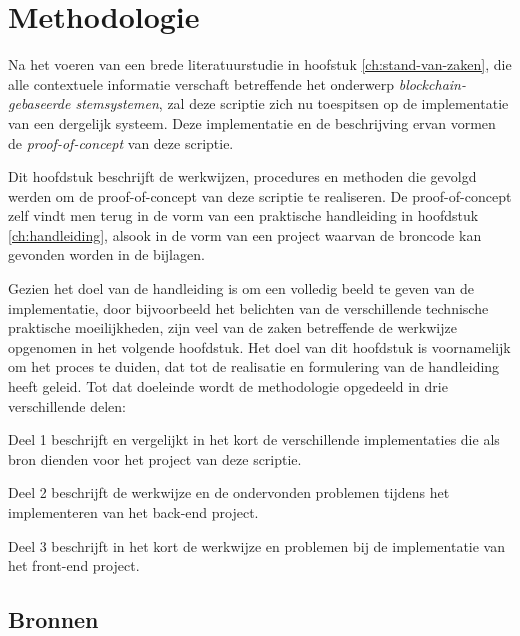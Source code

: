 
\chapter{Methodologie}
\label{ch:methodologie}

Na het voeren van een brede literatuurstudie in hoofstuk \ref{ch:stand-van-zaken}, die  alle contextuele informatie verschaft betreffende het onderwerp \textit{blockchain-gebaseerde stemsystemen}, zal deze scriptie zich nu toespitsen op de implementatie van een dergelijk systeem. Deze implementatie en de beschrijving ervan vormen de  \textit{proof-of-concept} van deze scriptie.

 Dit hoofdstuk beschrijft de werkwijzen, procedures en methoden die gevolgd werden om de  proof-of-concept van deze scriptie te realiseren. De proof-of-concept zelf vindt men terug in de vorm van een praktische handleiding in hoofdstuk \ref{ch:handleiding}, alsook in de vorm van een project waarvan de broncode kan gevonden worden in de bijlagen.
 
 Gezien het doel van de handleiding is om een volledig beeld te geven van de implementatie, door bijvoorbeeld het belichten van de verschillende technische praktische moeilijkheden, zijn veel van de zaken betreffende de werkwijze opgenomen in het volgende hoofdstuk. Het doel van dit hoofdstuk is voornamelijk om het proces te duiden, dat tot de realisatie en formulering van de handleiding heeft geleid. Tot dat doeleinde wordt de methodologie opgedeeld in drie verschillende delen:

Deel 1 beschrijft en vergelijkt in het kort de verschillende implementaties die als bron dienden voor het project van deze scriptie.

Deel 2 beschrijft de werkwijze en de ondervonden problemen tijdens het implementeren van het back-end project.

Deel 3 beschrijft in het kort de werkwijze en problemen bij de implementatie van het front-end project.

\section{Bronnen}
